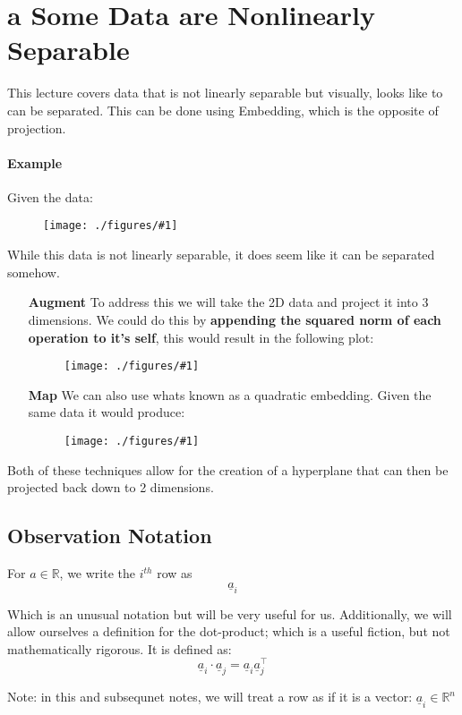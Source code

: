 \documentclass[12pt]{book}
\title{\coursetitle\linebreak\lecturename}
\author{\\Cain Susko\\ 
           \\ \\ \\
      Queen's University 
    \\School of Computing\\}
\newcommand{\incimg}[2]{%
       \begin{figure}[h]
               \centering
               \texttt{[image: ./figures/\#1]}
       \end{figure}
}
\newcommand{\und}{%
        \underline
}
\begin{document}
\begin{titlepage}
        \maketitle
\end{titlepage}


\section*{a Some Data are Nonlinearly Separable}
This lecture covers data that is not linearly separable but 
visually, looks like to can be separated. This can be done
using Embedding, which is the opposite of projection.

\paragraph{Example}
Given the data:
\incimg{smile}{0.5}

While this data is not linearly separable, it does seem like it can be 
separated somehow. 
\begin{itemize}
        \item[\textbf{Augment}]        
        To address this we will take the 2D data and 
        project it into 3 dimensions. We could do this by \textbf{appending
        the squared norm of each operation to it's self}, this would result 
        in the following plot:
        \incimg{smile3D}{0.5}
\pagebreak
        \item[\textbf{Map}] 
        We can also use whats known as a quadratic embedding. Given the same
        data it would produce:
        \incimg{smileQuad}{0.5}
\end{itemize}

Both of these techniques allow for the creation of a hyperplane that
can then be projected back down to 2 dimensions.

\subsection*{Observation Notation}
For $a \in \mathbb{R}$, we write the $i^{th}$ row as 
\[\und a_i\]

Which is an unusual notation but will be very useful for us. Additionally,
we will allow ourselves a definition for the dot-product; which
is a useful fiction, but not mathematically rigorous. It is defined as:
\[\und a_i \cdot \und a_j = \und a_i \und a_j^\top\]

Note: in this and subsequnet notes, we will treat a row as if it 
is a vector: $\und a_i \in \mathbb{R}^n$
\end{document}
